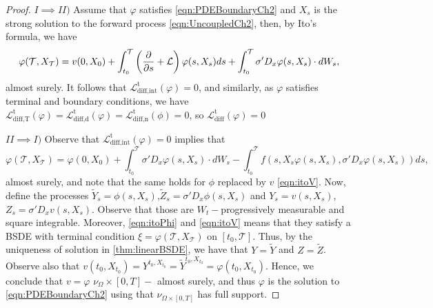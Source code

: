 \begin{proof}
	
	$I \implies II)$ Assume that $\varphi$ satisfies \eqref{eqn:PDEBoundaryCh2} and $X_s$ is the strong solution to the forward process \eqref{eqn:UncoupledCh2}, then, by Ito's formula, we have
\begin{equation}
	\varphi(\mathcal{T},X_\mathcal{T})=v(0,X_0)+\int_{t_0}^{\mathcal{T}}\left(\frac{\partial }{\partial s}+\mathcal{L}\right)\varphi(s,X_s)ds+\int_{t_0}^{\mathcal{T}}\sigma'D_x \varphi(s,X_s)\cdot dW_s,
\end{equation}
almost surely. It follows that $\mathcal{L}_{\text{diff,int}}^{\mathrm{t}}(\varphi)=0$, and similarly, as $\varphi$ satisfies terminal and boundary conditions, we have $\mathcal{L}_{\text{diff,T}}^{\mathrm{t}}(\varphi)=\mathcal{L}_{\text{diff,d}}^{\mathrm{t}}(\varphi)=\mathcal{L}_{\text{diff,n}}^{\mathrm{t}}(\phi)=0$, so $\mathcal{L}_{\text{diff}}^{\mathrm{t}}(\varphi)=0$

$II \implies I)$ Observe that $\mathcal{L}_{\text{diff,int}}^{\mathrm{t}}(\varphi)=0$ implies that 
\begin{equation}
	\label{eqn:itoPhi}
	\varphi(\mathcal{T},X_\mathcal{T})=\varphi(0,X_0)+\int_{t_0}^{\mathcal{T}}\sigma'D_x\varphi(s,X_s)\cdot dW_s-\int_{t_0}^{\mathcal{T}}f(s,X_s \varphi(s,X_s),\sigma' D_x \varphi(s,X_s))ds,
\end{equation}
almost surely, and note that the same holds for $\phi$ replaced by $v$ \eqref{eqn:itoV}. Now, define the processes $\tilde{Y}_s=\phi(s,X_s)$,$\tilde{Z}_s=\sigma'D_x \phi(s,X_s)$ and $Y_s=v(s,X_s)$,$Z_s=\sigma'D_x v(s,X_s)$. Observe that those are $W_{t}-$progressively measurable and square integrable. Moreover, \eqref{eqn:itoPhi} and \eqref{eqn:itoV} means that they satisfy a BSDE with terminal condition $\xi=\varphi(\mathcal{T},X_\mathcal{T})$ on $[t_0,\mathcal{T}]$. Thus, by the uniqueness of solution in \autoref{thm:linearBSDE}, we have that $Y=\tilde{Y}$ and $Z=\tilde{Z}$. Observe also that $v(t_{0},X_{t_0})=Y^{t_0,X_{t_0}}=\tilde{Y}^{t_0,X_{t_0}}=\varphi(t_0,X_{t_0})$. Hence, we conclude that $v=\varphi$ $\nu_{\Omega}\times [0,T]-$ almost surely, and thus $\varphi$ is the solution to \eqref{eqn:PDEBoundaryCh2} using that $\nu_{\Omega\times[0,T]}$ has full support.
\end{proof}


